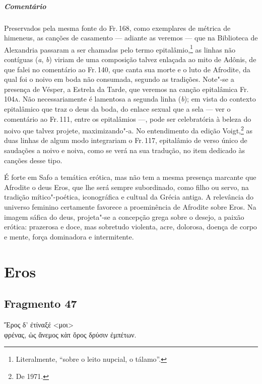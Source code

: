 \paragraph{Comentário} Preservados pela mesma fonte do Fr.\,168, como exemplares de métrica de
himeneus, as canções de casamento --- adiante as veremos --- que na
Biblioteca de Alexandria passaram a ser chamadas pelo termo epitalâmio,\footnote{Literalmente, ``sobre o leito nupcial, o tálamo''.} as linhas não contíguas (\emph{a}, \emph{b}) viriam de uma composição talvez enlaçada ao mito de Adônis, de que falei no
comentário ao Fr.\,140, que canta sua morte e o luto de Afrodite, da qual foi o noivo em boda não consumada, segundo as tradições. Note"-se
a presença de Vésper, a Estrela da Tarde, que veremos na canção
epitalâmica Fr.\,104\textsc{a}. Não necessariamente é lamentosa a segunda linha
(\emph{b}); em vista do contexto epitalâmico que traz o deus da boda, do
enlace sexual que a sela --- ver o comentário ao Fr.\,111, entre os
epitalâmios ---, pode ser celebratória à beleza do noivo que talvez projete, maximizando"-a. No entendimento da edição Voigt,\footnote{De 1971.} as duas linhas de algum modo integrariam o Fr.\,117, epitalâmio de verso único de saudações a noivo e noiva, como se verá na sua tradução, no item dedicado às canções desse tipo.

\begin{argumento}
É forte em Safo a temática erótica, mas não tem a mesma presença marcante que
Afrodite o deus Eros, que lhe será sempre subordinado, como filho ou servo, na
tradição mítico"-poética, iconográfica e cultual da Grécia antiga. A relevância do universo feminino certamente favorece a
proeminência de Afrodite sobre Eros. Na imagem sáfica do deus, projeta"-se a
concepção grega sobre o desejo, a paixão erótica: prazerosa e doce, mas
sobretudo violenta, acre, dolorosa, doença de corpo e mente, força dominadora e
intermitente.
\end{argumento}

\chapter{Eros}

\section{Fragmento 47}

\begin{gkverse}
Ἔρος δ’ ἐτίναξέ <μοι>\\
φρένας, ὠς ἄνεμος κὰτ ὄρος δρύσιν ἐμπέτων.
\end{gkverse}

